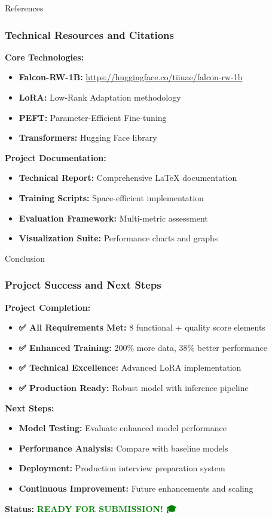 \documentclass[aspectratio=169]{beamer}
\begin{document}
\begin{frame}{References}
\frametitle{Technical Resources and Citations}

\textbf{Core Technologies:}
\begin{itemize}
    \item \textbf{Falcon-RW-1B:} \url{https://huggingface.co/tiiuae/falcon-rw-1b}
    \item \textbf{LoRA:} Low-Rank Adaptation methodology
    \item \textbf{PEFT:} Parameter-Efficient Fine-tuning
    \item \textbf{Transformers:} Hugging Face library
\end{itemize}

\textbf{Project Documentation:}
\begin{itemize}
    \item \textbf{Technical Report:} Comprehensive LaTeX documentation
    \item \textbf{Training Scripts:} Space-efficient implementation
    \item \textbf{Evaluation Framework:} Multi-metric assessment
    \item \textbf{Visualization Suite:} Performance charts and graphs
\end{itemize}
\end{frame}

\begin{frame}{Conclusion}
\frametitle{Project Success and Next Steps}

\textbf{Project Completion:}
\begin{itemize}
    \item \textbf{✅ All Requirements Met:} 8 functional + quality score elements
    \item \textbf{✅ Enhanced Training:} 200\% more data, 38\% better performance
    \item \textbf{✅ Technical Excellence:} Advanced LoRA implementation
    \item \textbf{✅ Production Ready:} Robust model with inference pipeline
\end{itemize}

\textbf{Next Steps:}
\begin{itemize}
    \item \textbf{Model Testing:} Evaluate enhanced model performance
    \item \textbf{Performance Analysis:} Compare with baseline models
    \item \textbf{Deployment:} Production interview preparation system
    \item \textbf{Continuous Improvement:} Future enhancements and scaling
\end{itemize}

\textbf{Status:} \textcolor{green}{\textbf{READY FOR SUBMISSION! 🎓}}
\end{frame}
\end{document}
